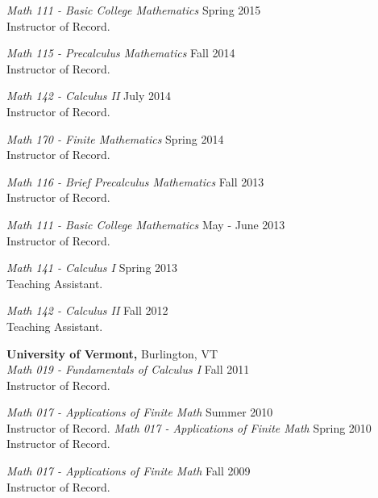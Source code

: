 \documentclass[line,margin]{res}
\begin{document}
\begin{resume}
                          {\sl Math 111 - Basic College Mathematics} \hfill Spring 2015\\
                          Instructor of Record.

                          {\sl Math 115 - Precalculus Mathematics} \hfill Fall 2014\\
                          Instructor of Record.

                          {\sl Math 142 - Calculus II} \hfill July 2014\\
                          Instructor of Record.

                          {\sl Math 170 - Finite Mathematics} \hfill Spring 2014\\
                          Instructor of Record.

                          {\sl Math 116 - Brief Precalculus Mathematics} \hfill Fall 2013\\
                          Instructor of Record.
                          

                          {\sl Math 111 - Basic College Mathematics} \hfill May - June 2013\\
                          Instructor of Record.

                          {\sl Math 141 - Calculus I} \hfill Spring 2013\\
                          Teaching Assistant.

                          {\sl Math 142 - Calculus II} \hfill Fall 2012\\
                          Teaching Assistant.

                          {\bf University of Vermont,} Burlington, VT\\
                          {\sl Math 019 - Fundamentals of Calculus I} Fall 2011\\
                          Instructor of Record.

                          {\sl Math 017 - Applications of Finite Math} Summer 2010\\
                          Instructor of Record.
\newpage
                          {\sl Math 017 - Applications of Finite Math} Spring 2010\\
                          Instructor of Record.

                          {\sl Math 017 - Applications of Finite Math} Fall 2009\\
                          Instructor of Record.

\end{resume}
\end{document}
